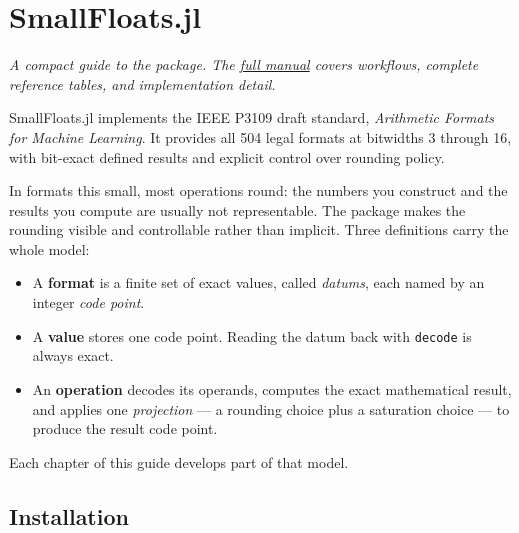 \newcommand{\DocMainTitle}{SmallFloats.jl Compact Guide}
\newcommand{\DocVersion}{0.4.0}
\newcommand{\DocAuthors}{Jeffrey Sarnoff}
\newcommand{\JuliaVersion}{1.12.7}






\chapter{SmallFloats.jl}



\label{2801651161961906345}{}


\emph{A compact guide to the package. The \href{https://JeffreySarnoff.github.io/SmallFloats.jl}{full manual} covers workflows, complete reference tables, and implementation detail.}



SmallFloats.jl implements the IEEE P3109 draft standard, \emph{Arithmetic Formats for Machine Learning}. It provides all 504 legal formats at bitwidths 3 through 16, with bit-exact defined results and explicit control over rounding policy.



In formats this small, most operations round: the numbers you construct and the results you compute are usually not representable. The package makes the rounding visible and controllable rather than implicit. Three definitions carry the whole model:



\begin{itemize}
\item A \textbf{format} is a finite set of exact values, called \emph{datums}, each named by an integer \emph{code point}.


\item A \textbf{value} stores one code point. Reading the datum back with \texttt{decode} is always exact.


\item An \textbf{operation} decodes its operands, computes the exact mathematical result, and applies one \emph{projection} — a rounding choice plus a saturation choice — to produce the result code point.

\end{itemize}


Each chapter of this guide develops part of that model.



\section{Installation}




